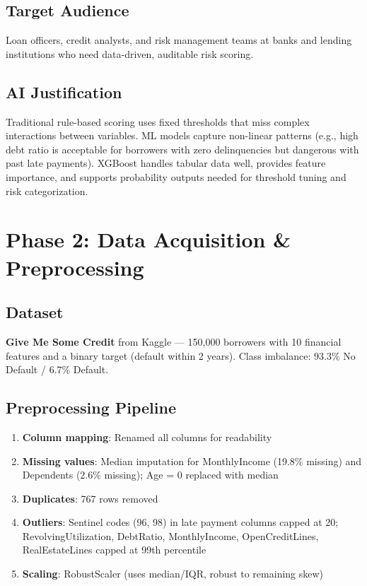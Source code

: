 \documentclass[12pt, a4paper]{article}
\begin{document}
\subsection{Target Audience}

Loan officers, credit analysts, and risk management teams at banks and lending institutions who need data-driven, auditable risk scoring.

\subsection{AI Justification}

Traditional rule-based scoring uses fixed thresholds that miss complex interactions between variables. ML models capture non-linear patterns (e.g., high debt ratio is acceptable for borrowers with zero delinquencies but dangerous with past late payments). XGBoost handles tabular data well, provides feature importance, and supports probability outputs needed for threshold tuning and risk categorization.

\section{Phase 2: Data Acquisition \& Preprocessing}

\subsection{Dataset}

\textbf{Give Me Some Credit} from Kaggle --- 150,000 borrowers with 10 financial features and a binary target (default within 2 years). Class imbalance: 93.3\% No Default / 6.7\% Default.

\subsection{Preprocessing Pipeline}

\begin{enumerate}[noitemsep]
    \item \textbf{Column mapping}: Renamed all columns for readability
    \item \textbf{Missing values}: Median imputation for MonthlyIncome (19.8\% missing) and Dependents (2.6\% missing); Age = 0 replaced with median
    \item \textbf{Duplicates}: 767 rows removed
    \item \textbf{Outliers}: Sentinel codes (96, 98) in late payment columns capped at 20; RevolvingUtilization, DebtRatio, MonthlyIncome, OpenCreditLines, RealEstateLines capped at 99th percentile
    \item \textbf{Scaling}: RobustScaler (uses median/IQR, robust to remaining skew)
\end{enumerate}
\end{document}
